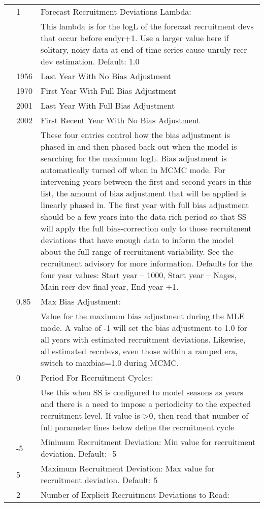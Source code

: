 \begin{center}
\begin{longtable}{p{1cm} p{3cm} p{11cm}}
		& 1 & Forecast Recruitment Deviations Lambda:\\
		&   & This lambda is for the logL of the forecast recruitment devs that occur before endyr+1.  Use a larger value here if solitary, noisy data at end of time series cause unruly recr dev estimation. Default:  1.0 \\
		& 1956 & Last Year With No Bias Adjustment \\
		& 1970 & First Year With Full Bias Adjustment \\
		& 2001 & Last Year With Full Bias Adjustment \\
		& 2002 & First Recent Year With No Bias Adjustment \\
		&      & These four entries control how the bias adjustment is phased in and then phased back out when the model is searching for the maximum logL.  Bias adjustment is automatically turned off when in MCMC mode.  For intervening years between the first and second years in this list, the amount of bias adjustment that will be applied is linearly phased in.  The first year with full bias adjustment should be a few years into the data-rich period so that SS will apply the full bias-correction only to those recruitment deviations that have enough data to inform the model about the full range of recruitment variability.  See the recruitment advisory for more information.
		Defaults for the four year values: Start year – 1000, Start year – Nages, Main recr dev final year, End year +1.\\
		& 0.85 & Max Bias Adjustment: \\
		&      & Value for the maximum bias adjustment during the MLE mode. A value of -1 will set the bias adjustment to 1.0 for all years with estimated recruitment deviations. Likewise, all estimated recrdevs, even those within a ramped era, switch to maxbias=1.0 during MCMC.\\
		& 0    & Period For Recruitment Cycles: \\
		&      & Use this when SS is configured to model seasons as years and there is a need to impose a periodicity to the expected recruitment level.  If value is >0, then read that number of full parameter lines below define the recruitment cycle \\
		& -5   & Minimum Recruitment Deviation: Min value for recruitment deviation. Default: -5\\
		& 5    & Maximum Recruitment Deviation: Max value for recruitment deviation. Default: 5\\
		& 2    & Number of Explicit Recruitment Deviations to Read:\\

\end{longtable}
\end{center}
